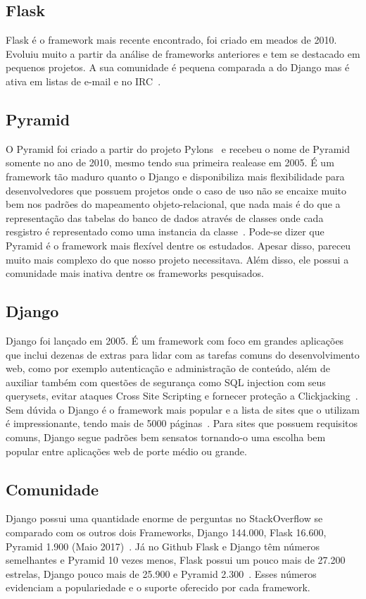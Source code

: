 \documentclass[a4paper, 12pt, oneside]{book}
\begin{document}
\subsection{Flask}
Flask é o framework mais recente encontrado, foi criado em meados de 2010. Evoluiu muito a partir da análise de frameworks anteriores e tem se destacado em pequenos projetos. A sua comunidade é pequena comparada a do Django mas é ativa em listas de e-mail e no IRC~\cite{ryanbrown}. 

\subsection{Pyramid}
O Pyramid foi criado a partir do projeto Pylons~\cite{pylonsproject} e recebeu o nome de Pyramid somente no ano de 2010, mesmo tendo sua primeira realease em 2005. É um framework tão maduro quanto o Django e disponibiliza mais flexibilidade para desenvolvedores que possuem projetos onde o caso de uso não se encaixe muito bem nos padrões do mapeamento objeto-relacional, que nada mais é do que a representação das tabelas do banco de dados através de classes onde cada resgistro é representado como uma instancia da classe~\cite{pyramid}. Pode-se dizer que Pyramid é o framework mais flexível dentre os estudados. Apesar disso, pareceu muito mais complexo do que nosso projeto necessitava. Além disso, ele possui a comunidade mais inativa dentre os frameworks pesquisados.

\subsection{Django}
Django foi lançado em 2005. É um framework com foco em grandes aplicações que inclui dezenas de extras para lidar com as tarefas comuns do desenvolvimento web, como por exemplo autenticação e administração de conteúdo, além de auxiliar também com questões de segurança como SQL injection com seus querysets, evitar ataques Cross Site Scripting e fornecer proteção a Clickjacking~\cite{django}. Sem dúvida o Django é o framework mais popular e a lista de sites que o utilizam é impressionante, tendo mais de 5000 páginas~\cite{listadjangosites}. Para sites que possuem requisitos comuns, Django segue padrões bem sensatos tornando-o uma escolha bem popular entre aplicações web de porte médio ou grande.

\subsection{Comunidade}
Django possui uma quantidade enorme de perguntas no StackOverflow se comparado com os outros dois Frameworks, Django 144.000, Flask 16.600, Pyramid 1.900 (Maio 2017)~\cite{stackoverflowtags}. Já no Github Flask e Django têm números semelhantes e Pyramid 10 vezes menos, Flask possui um pouco mais de 27.200 estrelas, Django pouco mais de 25.900 e Pyramid 2.300~\cite{github}. Esses números evidenciam a populariedade e o suporte oferecido por cada framework.
\end{document}
